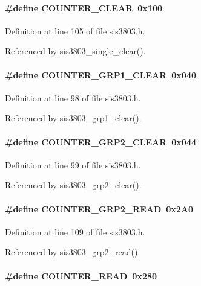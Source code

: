 \paragraph[{COUNTER\_\-CLEAR}]{\setlength{\rightskip}{0pt plus 5cm}\#define COUNTER\_\-CLEAR~0x100}\hfill\label{sis3803_8h_afd098aa892f64c116c4e1c3b572805bb}


Definition at line 105 of file sis3803.h.

Referenced by sis3803\_\-single\_\-clear().
\paragraph[{COUNTER\_\-GRP1\_\-CLEAR}]{\setlength{\rightskip}{0pt plus 5cm}\#define COUNTER\_\-GRP1\_\-CLEAR~0x040}\hfill\label{sis3803_8h_ae25b7e69b22e65ec6a359faaa6f5dfc2}


Definition at line 98 of file sis3803.h.

Referenced by sis3803\_\-grp1\_\-clear().
\paragraph[{COUNTER\_\-GRP2\_\-CLEAR}]{\setlength{\rightskip}{0pt plus 5cm}\#define COUNTER\_\-GRP2\_\-CLEAR~0x044}\hfill\label{sis3803_8h_a8c55c516b0b544f8fd7f56308fd2e746}


Definition at line 99 of file sis3803.h.

Referenced by sis3803\_\-grp2\_\-clear().
\paragraph[{COUNTER\_\-GRP2\_\-READ}]{\setlength{\rightskip}{0pt plus 5cm}\#define COUNTER\_\-GRP2\_\-READ~0x2A0}\hfill\label{sis3803_8h_a7eae9cb3a97e957f46dae69046fd6660}


Definition at line 109 of file sis3803.h.

Referenced by sis3803\_\-grp2\_\-read().
\paragraph[{COUNTER\_\-READ}]{\setlength{\rightskip}{0pt plus 5cm}\#define COUNTER\_\-READ~0x280}\hfill\label{sis3803_8h_a0f2803b393eeb4bfa14d6dbae1f51f18}


